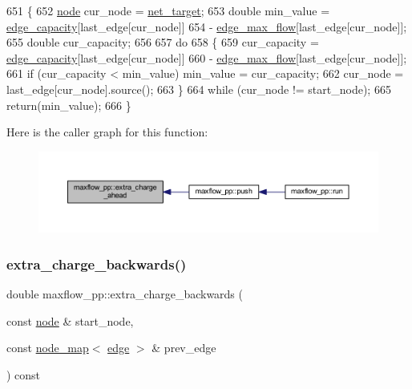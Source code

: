 \begin{DoxyCode}
651 \{
652     \mbox{\hyperlink{classnode}{node}} cur\_node = \mbox{\hyperlink{classmaxflow__pp_a10f0b047011e04cb4816a824da5b7892}{net\_target}};
653     \textcolor{keywordtype}{double} min\_value = \mbox{\hyperlink{classmaxflow__pp_af3cdc4999a86322271a80b1855d58629}{edge\_capacity}}[last\_edge[cur\_node]] 
654     - \mbox{\hyperlink{classmaxflow__pp_a25d5bb2ab6c775a634dacf408ff55a83}{edge\_max\_flow}}[last\_edge[cur\_node]];
655     \textcolor{keywordtype}{double} cur\_capacity;
656 
657     \textcolor{keywordflow}{do}
658     \{
659     cur\_capacity = \mbox{\hyperlink{classmaxflow__pp_af3cdc4999a86322271a80b1855d58629}{edge\_capacity}}[last\_edge[cur\_node]] 
660         - \mbox{\hyperlink{classmaxflow__pp_a25d5bb2ab6c775a634dacf408ff55a83}{edge\_max\_flow}}[last\_edge[cur\_node]];
661     \textcolor{keywordflow}{if} (cur\_capacity < min\_value) min\_value = cur\_capacity;
662     cur\_node = last\_edge[cur\_node].source();
663     \}
664     \textcolor{keywordflow}{while} (cur\_node != start\_node);
665     \textcolor{keywordflow}{return}(min\_value);
666 \}
\end{DoxyCode}
Here is the caller graph for this function\+:\nopagebreak
\begin{figure}[H]
\begin{center}
\leavevmode
\includegraphics[width=350pt]{classmaxflow__pp_af60a96de8ef929ceefd32d387e8e1638_icgraph}
\end{center}
\end{figure}
\mbox{\label{classmaxflow__pp_a9d9651e53139201506b22eed1ecbdd51}} 
\subsubsection{\texorpdfstring{extra\+\_\+charge\+\_\+backwards()}{extra\_charge\_backwards()}}
{\footnotesize\ttfamily double maxflow\+\_\+pp\+::extra\+\_\+charge\+\_\+backwards (\begin{DoxyParamCaption}\item[{const \mbox{\hyperlink{classnode}{node}} \&}]{start\+\_\+node,  }\item[{const \mbox{\hyperlink{classnode__map}{node\+\_\+map}}$<$ \mbox{\hyperlink{classedge}{edge}} $>$ \&}]{prev\+\_\+edge }\end{DoxyParamCaption}) const\hspace{0.3cm}{\ttfamily [protected]}}



